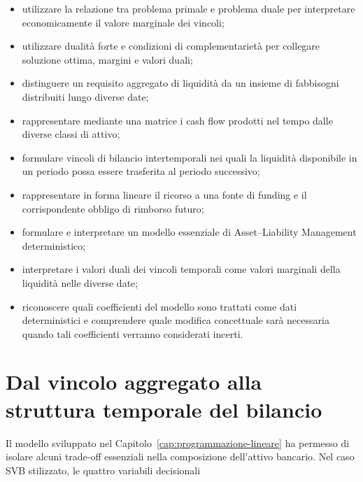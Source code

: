 \begin{itemize}

\item utilizzare la relazione tra problema primale e problema duale per
interpretare economicamente il valore marginale dei vincoli;

\item utilizzare dualit\`{a} forte e condizioni di complementariet\`{a} per
collegare soluzione ottima, margini e valori duali;

\item distinguere un requisito aggregato di liquidit\`{a} da un insieme di
fabbisogni distribuiti lungo diverse date;

\item rappresentare mediante una matrice i cash flow prodotti nel tempo dalle
diverse classi di attivo;

\item formulare vincoli di bilancio intertemporali nei quali la liquidit\`{a}
disponibile in un periodo possa essere trasferita al periodo successivo;

\item rappresentare in forma lineare il ricorso a una fonte di funding e il
corrispondente obbligo di rimborso futuro;

\item formulare e interpretare un modello essenziale di
Asset--Liability Management deterministico;

\item interpretare i valori duali dei vincoli temporali come valori marginali
della liquidit\`{a} nelle diverse date;

\item riconoscere quali coefficienti del modello sono trattati come dati
deterministici e comprendere quale modifica concettuale sar\`{a} necessaria
quando tali coefficienti verranno considerati incerti.

\end{itemize}

\section{Dal vincolo aggregato alla struttura temporale del bilancio}

\label{sec:cap12-dal-vincolo-al-tempo}

Il modello sviluppato nel Capitolo~\ref{cap:programmazione-lineare} ha
permesso di isolare alcuni trade-off essenziali nella composizione dell'attivo
bancario. Nel caso SVB stilizzato, le quattro variabili decisionali

